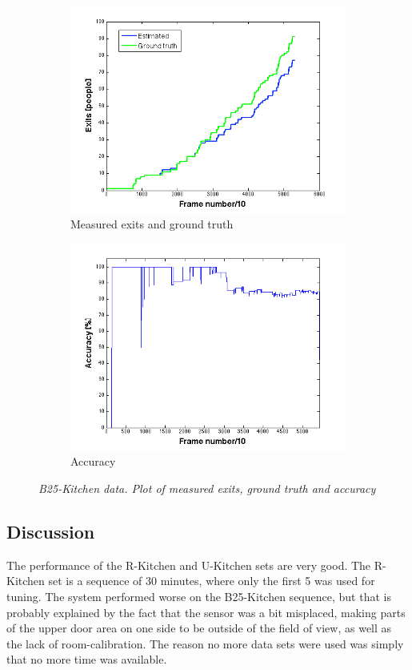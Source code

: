 \begin{figure}[H]
\centering
\begin{subfigure}{.5\textwidth}
  \centering
  \includegraphics[width=1.1\linewidth]{images/ExitsEval.png}
  \caption{Measured exits and ground truth}
  \label{fig:sub1}
\end{subfigure}%
\begin{subfigure}{.5\textwidth}
  \centering
  \includegraphics[width=1.1\linewidth]{images/AccExitsEval.png}
  \caption{Accuracy}
  \label{fig:sub2}
\end{subfigure}
\caption[B25-kitchen exits]{\textit{B25-Kitchen data. Plot of measured exits, ground truth and accuracy}}
\label{fig:B25-kitchen exits}
\end{figure}

\subsection{Discussion}
The performance of the R-Kitchen and U-Kitchen sets are very good. The R-Kitchen set is a sequence of 30 minutes, where only the first 5 was used for tuning. The system performed worse on the B25-Kitchen sequence, but that is probably explained by the fact that the sensor was a bit misplaced, making parts of the upper door area on one side to be outside of the field of view, as well as the lack of room-calibration. The reason no more data sets were used was simply that no more time was available.


